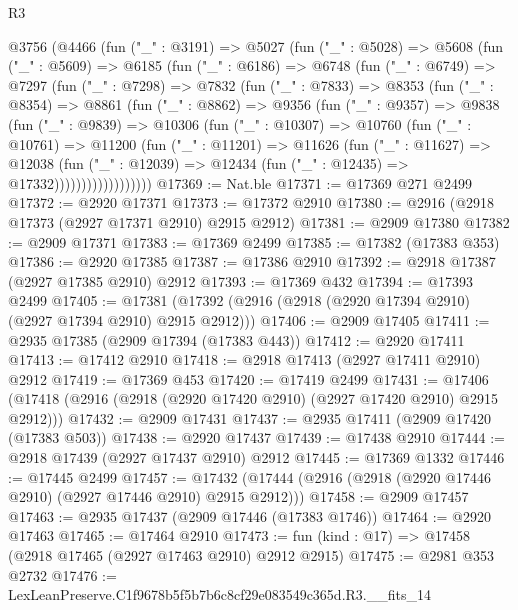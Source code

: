 \begin{lexlean}{R3}
\begin{coremodule}
  @3756
    (@4466
      (fun ("_" : @3191) =>
      @5027
        (fun ("_" : @5028) =>
        @5608
          (fun ("_" : @5609) =>
          @6185
            (fun ("_" : @6186) =>
            @6748
              (fun ("_" : @6749) =>
              @7297
                (fun ("_" : @7298) =>
                @7832
                  (fun ("_" : @7833) =>
                  @8353
                    (fun ("_" : @8354) =>
                    @8861
                      (fun ("_" : @8862) =>
                      @9356
                        (fun ("_" : @9357) =>
                        @9838
                          (fun ("_" : @9839) =>
                          @10306
                            (fun ("_" : @10307) =>
                            @10760
                              (fun ("_" : @10761) =>
                              @11200
                                (fun ("_" : @11201) =>
                                @11626
                                  (fun ("_" : @11627) =>
                                  @12038
                                    (fun ("_" : @12039) =>
                                    @12434 (fun ("_" : @12435) => @17332))))))))))))))))))
@17369 := Nat.ble
@17371 := @17369 @271 @2499
@17372 := @2920 @17371
@17373 := @17372 @2910
@17380 := @2916 (@2918 @17373 (@2927 @17371 @2910) @2915 @2912)
@17381 := @2909 @17380
@17382 := @2909 @17371
@17383 := @17369 @2499
@17385 := @17382 (@17383 @353)
@17386 := @2920 @17385
@17387 := @17386 @2910
@17392 := @2918 @17387 (@2927 @17385 @2910) @2912
@17393 := @17369 @432
@17394 := @17393 @2499
@17405 := @17381 (@17392 (@2916 (@2918 (@2920 @17394 @2910) (@2927 @17394 @2910) @2915 @2912)))
@17406 := @2909 @17405
@17411 := @2935 @17385 (@2909 @17394 (@17383 @443))
@17412 := @2920 @17411
@17413 := @17412 @2910
@17418 := @2918 @17413 (@2927 @17411 @2910) @2912
@17419 := @17369 @453
@17420 := @17419 @2499
@17431 := @17406 (@17418 (@2916 (@2918 (@2920 @17420 @2910) (@2927 @17420 @2910) @2915 @2912)))
@17432 := @2909 @17431
@17437 := @2935 @17411 (@2909 @17420 (@17383 @503))
@17438 := @2920 @17437
@17439 := @17438 @2910
@17444 := @2918 @17439 (@2927 @17437 @2910) @2912
@17445 := @17369 @1332
@17446 := @17445 @2499
@17457 := @17432 (@17444 (@2916 (@2918 (@2920 @17446 @2910) (@2927 @17446 @2910) @2915 @2912)))
@17458 := @2909 @17457
@17463 := @2935 @17437 (@2909 @17446 (@17383 @1746))
@17464 := @2920 @17463
@17465 := @17464 @2910
@17473 := fun (kind : @17) => @17458 (@2918 @17465 (@2927 @17463 @2910) @2912 @2915)
@17475 := @2981 @353 @2732
@17476 := LexLeanPreserve.C1f9678b5f5b7b6c8cf29e083549c365d.R3.__fits_14

\end{coremodule}
\end{lexlean}

